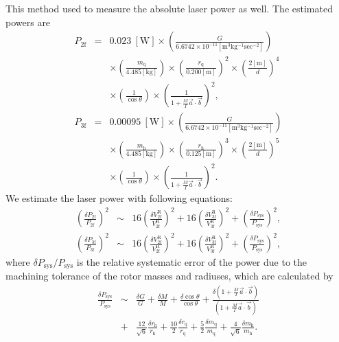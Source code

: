 \documentclass[%
 reprint,
superscriptaddress,
 amsmath,amssymb,
 aps,
]{revtex4-1}
\begin{document}
This method used to measure the absolute laser power as well. The estimated powers are
\footnotesize
\begin{eqnarray}
P_{\mathrm{2f}}&=&0.023 ~\mathrm{[W]}\times \left( \frac{G}{6.6742 \times 10^{-11} \mathrm{[m^3kg^{-1}sec^{-2}]}} \right) \nonumber \\
&& \times \left( \frac{m_{\mathrm{q}}}{4.485 \mathrm{[kg]}} \right) \times \left( \frac{r_{\mathrm{q}}}{0.200 \mathrm{[m]}} \right)^2 \times \left( \frac{2\mathrm{[m]}}{d} \right)^4 \nonumber \\ &&\times \left( \frac{1}{\cos{\theta}} \right) \times \left( \frac{1}{1+\frac{M}{I}\vec{a}\cdot \vec{b}} \right)^2,\\
P_{\mathrm{3f}}&=&0.00095~\mathrm{[W]} \times \left( \frac{G}{6.6742 \times 10^{-11} \mathrm{[m^3kg^{-1}sec^{-2}]}} \right) \nonumber \\
&& \times \left( \frac{m_{\mathrm{h}}}{4.485 \mathrm{[kg]}} \right) \times \left( \frac{r_{\mathrm{h}}}{0.125 \mathrm{[m]}} \right)^3 \times \left( \frac{2\mathrm{[m]}}{d} \right)^5 \nonumber \\ &&\times \left( \frac{1}{\cos{\theta}} \right) \times \left( \frac{1}{1+\frac{M}{I}\vec{a}\cdot \vec{b}} \right)^2.
\end{eqnarray}
\normalsize
We estimate the laser power with following equations:
\footnotesize
\begin{eqnarray}
\left( \frac{\delta P_{\mathrm{2f}}}{P_{\mathrm{2f}}} \right)^2 &\sim&  \!16 \! \left( \frac{\delta V^{\mathrm{R}}_{{\mathrm{2f}}}}{V^{\mathrm{R}}_{{\mathrm{2f}}}} \!\right)^2+16\left( \frac{\delta V^{\mathrm{R}}_{{\mathrm{3f}}}}{V^{\mathrm{R}}_{{\mathrm{3f}}}} \right)^2 +\left( \frac{\delta P_{\mathrm{sys}}}{P_{\mathrm{sys}}} \right)^2, \label{dP2f} \\ 
\left( \frac{\delta P_{\mathrm{3f}}}{P_{\mathrm{3f}}} \right)^2 &\sim&  \!16 \! \left( \frac{\delta V^{\mathrm{R}}_{{\mathrm{2f}}}}{V^{\mathrm{R}}_{{\mathrm{2f}}}} \right)^2+16\left( \frac{\delta V^{\mathrm{R}}_{{\mathrm{3f}}}}{V^{\mathrm{R}}_{{\mathrm{3f}}}} \right)^2+\left( \frac{\delta P_{\mathrm{sys}}}{P_{\mathrm{sys}}} \right)^2,  \label{dP3f}
\end{eqnarray}
\normalsize
where $\delta P_{\mathrm{sys}}/P_{\mathrm{sys}}$ is the relative systematic error of the power due to the machining tolerance of the rotor masses and radiuses, which are calculated by
\begin{eqnarray}
\frac{\delta P_{\mathrm{sys}}}{P_{\mathrm{sys}}}&\sim& \frac{\delta G}{G} + \frac{\delta M}{M} +\frac{\delta \cos{\theta}}{\cos{\theta}}+ \frac{\delta\left( 1+\frac{M}{I}\vec{a}\cdot \vec{b} \right)}{\! \left( \! 1+\frac{M}{I}\vec{a}\cdot \vec{b} \! \right)}  \nonumber \\
&+&\frac{12}{\sqrt{6}} \frac{\delta r_{\mathrm{h}}}{r_{\mathrm{h}}} +\frac{10}{2} \frac{\delta r_{\mathrm{q}}}{r_{\mathrm{q}}}  +\frac{5}{2} \frac{\delta m_{\mathrm{q}}}{m_{\mathrm{q}}} +\!\frac{4}{\sqrt{6}}  \! \frac{\delta m_{\mathrm{h}}}{m_{\mathrm{h}}}.
\end{eqnarray}
\end{document}
